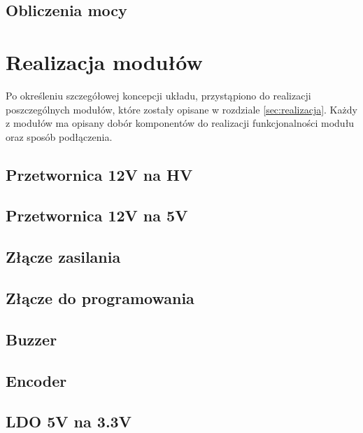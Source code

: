 \documentclass[twoside]{article}
\begin{document}
\subsection{Obliczenia mocy}

\newpage

\section{Realizacja modułów}
Po określeniu szczegółowej koncepcji układu, przystąpiono do realizacji poszczególnych modułów, które zostały opisane w rozdziale \ref{sec:realizacja}.
Każdy z modułów ma opisany dobór komponentów do realizacji funkcjonalności modułu oraz sposób podłączenia.

\subsection{Przetwornica 12V na HV}


\subsection{Przetwornica 12V na 5V}
\newpage


\newpage

\subsection{Złącze zasilania}

\newpage

\subsection{Złącze do programowania}
\label{sec:usb_c_to_program}

\newpage


\subsection{Buzzer}

\newpage

\subsection{Encoder}

\newpage

\subsection{LDO 5V na 3.3V}

\newpage
\end{document}
